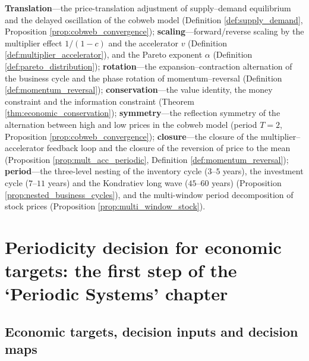 \begin{remark}\label{rem:econ_seven_themes}
\textbf{Translation}---the price-translation adjustment of supply--demand equilibrium and the delayed oscillation of the cobweb model (Definition \ref{def:supply_demand}, Proposition \ref{prop:cobweb_convergence}); \textbf{scaling}---forward/reverse scaling by the multiplier effect $1/(1-c)$ and the accelerator $v$ (Definition \ref{def:multiplier_accelerator}), and the Pareto exponent $\alpha$ (Definition \ref{def:pareto_distribution}); \textbf{rotation}---the expansion--contraction alternation of the business cycle and the phase rotation of momentum--reversal (Definition \ref{def:momentum_reversal}); \textbf{conservation}---the value identity, the money constraint and the information constraint (Theorem \ref{thm:economic_conservation}); \textbf{symmetry}---the reflection symmetry of the alternation between high and low prices in the cobweb model (period $T=2$, Proposition \ref{prop:cobweb_convergence}); \textbf{closure}---the closure of the multiplier--accelerator feedback loop and the closure of the reversion of price to the mean (Proposition \ref{prop:mult_acc_periodic}, Definition \ref{def:momentum_reversal}); \textbf{period}---the three-level nesting of the inventory cycle ($3$--$5$ years), the investment cycle ($7$--$11$ years) and the Kondratiev long wave ($45$--$60$ years) (Proposition \ref{prop:nested_business_cycles}), and the multi-window period decomposition of stock prices (Proposition \ref{prop:multi_window_stock}).
\end{remark}

\section{Periodicity decision for economic targets: the first step of the `Periodic Systems' chapter}
\label{sec:econ_periodicity_decision}

\subsection{Economic targets, decision inputs and decision maps}

